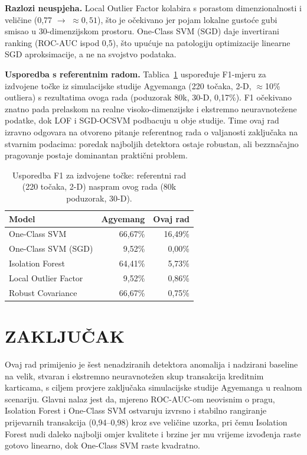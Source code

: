 \documentclass[letterpaper, 10pt, conference]{ieeeconf}
\begin{document}
\textbf{Razlozi neuspjeha.} Local Outlier Factor kolabira s porastom dimenzionalnosti i veličine (0,77 $\rightarrow$ $\approx 0,51$), što je očekivano jer pojam lokalne gustoće gubi smisao u 30-dimenzijskom prostoru. One-Class SVM (SGD) daje invertirani ranking (ROC-AUC ispod 0,5), što upućuje na patologiju optimizacije linearne SGD aproksimacije, a ne na svojstvo podataka.

\textbf{Usporedba s referentnim radom.} Tablica~\ref{tab:agyemang} uspoređuje F1-mjeru za izdvojene točke iz simulacijske studije Agyemanga \cite{agyemang} (220 točaka, 2-D, $\approx$10\% outliera) s rezultatima ovoga rada (poduzorak 80k, 30-D, 0,17\%). F1 očekivano znatno pada prelaskom na realne visoko-dimenzijske i ekstremno neuravnotežene podatke, dok LOF i SGD-OCSVM podbacuju u obje studije. Time ovaj rad izravno odgovara na otvoreno pitanje referentnog rada o valjanosti zaključaka na stvarnim podacima: poredak najboljih detektora ostaje robustan, ali bezznačajno pragovanje postaje dominantan praktični problem.

\begin{table}[t]
\caption{Usporedba F1 za izdvojene točke: referentni rad (220 točaka, 2-D) naspram ovog rada (80k poduzorak, 30-D).}
\label{tab:agyemang}
\centering
\begin{tabular}{@{}lrr@{}}
\toprule
Model & Agyemang \cite{agyemang} & Ovaj rad \\
\midrule
One-Class SVM        & 66,67\% & 16,49\% \\
One-Class SVM (SGD)  & 9,52\%  & 0,00\% \\
Isolation Forest     & 64,41\% & 5,73\% \\
Local Outlier Factor & 9,52\%  & 0,86\% \\
Robust Covariance    & 66,67\% & 0,75\% \\
\bottomrule
\end{tabular}
\end{table}

\section{\textbf{ZAKLJUČAK}}

Ovaj rad primijenio je šest nenadziranih detektora anomalija i nadzirani baseline na velik, stvaran i ekstremno neuravnotežen skup transakcija kreditnim karticama, s ciljem provjere zaključaka simulacijske studije Agyemanga \cite{agyemang} u realnom scenariju. Glavni nalaz jest da, mjereno ROC-AUC-om neovisnim o pragu, Isolation Forest i One-Class SVM ostvaruju izvrsno i stabilno rangiranje prijevarnih transakcija (0,94--0,98) kroz sve veličine uzorka, pri čemu Isolation Forest nudi daleko najbolji omjer kvalitete i brzine jer mu vrijeme izvođenja raste gotovo linearno, dok One-Class SVM raste kvadratno.
\end{document}
